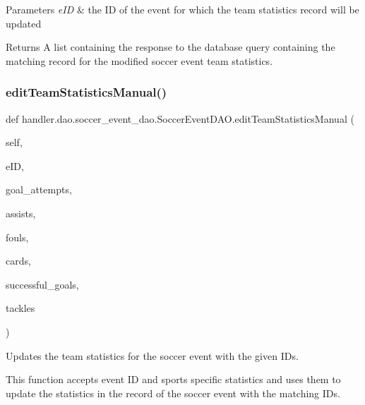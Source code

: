 \begin{DoxyParams}{Parameters}
{\em e\+ID} & the ID of the event for which the team statistics record will be updated\\
\hline
\end{DoxyParams}
\begin{DoxyReturn}{Returns}
A list containing the response to the database query containing the matching record for the modified soccer event team statistics. 
\end{DoxyReturn}
\mbox{\label{classhandler_1_1dao_1_1soccer__event__dao_1_1_soccer_event_d_a_o_a6562b7b676458565a51144139b7d6643}} 
\subsubsection{\texorpdfstring{edit\+Team\+Statistics\+Manual()}{editTeamStatisticsManual()}}
{\footnotesize\ttfamily def handler.\+dao.\+soccer\+\_\+event\+\_\+dao.\+Soccer\+Event\+D\+A\+O.\+edit\+Team\+Statistics\+Manual (\begin{DoxyParamCaption}\item[{}]{self,  }\item[{}]{e\+ID,  }\item[{}]{goal\+\_\+attempts,  }\item[{}]{assists,  }\item[{}]{fouls,  }\item[{}]{cards,  }\item[{}]{successful\+\_\+goals,  }\item[{}]{tackles }\end{DoxyParamCaption})}



Updates the team statistics for the soccer event with the given I\+Ds. 

This function accepts event ID and sports specific statistics and uses them to update the statistics in the record of the soccer event with the matching I\+Ds.



